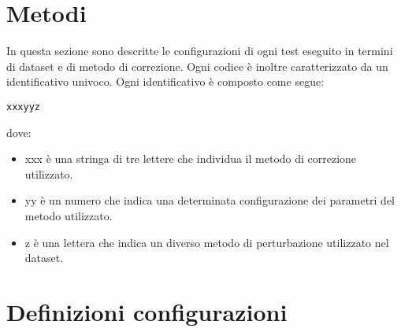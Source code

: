 \documentclass[12pt]{article}
\begin{document}
\maketitle




\section{Metodi}
In questa sezione sono descritte le configurazioni di ogni test eseguito in termini di dataset e di metodo di correzione. Ogni codice è inoltre caratterizzato da un identificativo univoco. Ogni identificativo è composto come segue:
\begin{center}
\texttt{xxxyyz}
\end{center}
dove:
\begin{itemize}
\item xxx è una stringa di tre lettere che individua il metodo di correzione utilizzato.
\item yy è un numero che indica una determinata configurazione dei parametri del metodo utilizzato.
\item z è una lettera che indica un diverso metodo di perturbazione utilizzato nel dataset.
\end{itemize}

\section{Definizioni configurazioni}
\end{document}
